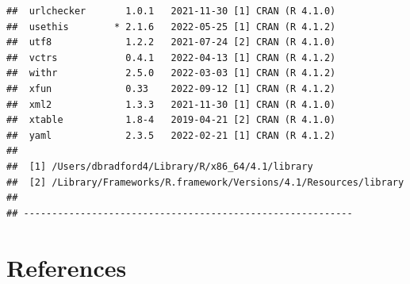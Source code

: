\documentclass[print]{nuthesis}
\begin{document}
\begin{verbatim}
##  urlchecker       1.0.1   2021-11-30 [1] CRAN (R 4.1.0)
##  usethis        * 2.1.6   2022-05-25 [1] CRAN (R 4.1.2)
##  utf8             1.2.2   2021-07-24 [2] CRAN (R 4.1.0)
##  vctrs            0.4.1   2022-04-13 [1] CRAN (R 4.1.2)
##  withr            2.5.0   2022-03-03 [1] CRAN (R 4.1.2)
##  xfun             0.33    2022-09-12 [1] CRAN (R 4.1.2)
##  xml2             1.3.3   2021-11-30 [1] CRAN (R 4.1.0)
##  xtable           1.8-4   2019-04-21 [2] CRAN (R 4.1.0)
##  yaml             2.3.5   2022-02-21 [1] CRAN (R 4.1.2)
## 
##  [1] /Users/dbradford4/Library/R/x86_64/4.1/library
##  [2] /Library/Frameworks/R.framework/Versions/4.1/Resources/library
## 
## ----------------------------------------------------------
\end{verbatim}

\backmatter

\hypertarget{references}{%
\chapter*{References}\label{references}}

\noindent

\setlength{\parindent}{-0.20in}
\setlength{\leftskip}{0.20in}
\setlength{\parskip}{8pt}
\end{document}
